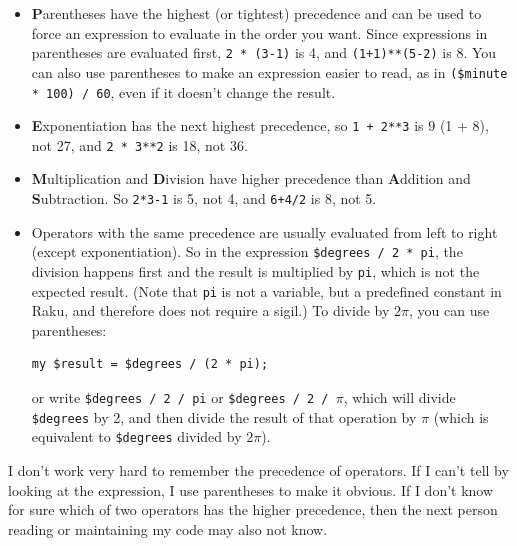\begin{itemize}

\item {\bf P}arentheses have the highest (or tightest) precedence and can be used 
to force an expression to evaluate in the order you want. Since
expressions in parentheses are evaluated first, {\tt 2 * (3-1)} is 4,
and {\tt (1+1)**(5-2)} is 8. You can also use parentheses to make an
expression easier to read, as in {\tt (\$minute * 100) / 60}, even
if it doesn't change the result.

\item {\bf E}xponentiation has the next highest precedence, so
{\tt 1 + 2**3} is 9 (1 + 8), not 27, and {\tt 2 * 3**2} is 18, not 36.

\item {\bf M}ultiplication and {\bf D}ivision have higher precedence
  than {\bf A}ddition and {\bf S}ubtraction.  So {\tt 2*3-1} is 5, not
  4, and {\tt 6+4/2} is 8, not 5.

\item Operators with the same precedence are usually evaluated 
from left to right (except exponentiation).  So in the expression 
{\tt \$degrees / 2 * pi}, the division happens first and the 
result is multiplied by {\tt pi}, which is not the expected 
result. (Note that {\tt pi} is not a variable, but a predefined 
constant in Raku, and therefore does not require a sigil.)  To 
divide by $2 \pi$, you can use parentheses:
  
\begin{verbatim}
my $result = $degrees / (2 * pi);  
\end{verbatim}  
 
or write
  {\tt \$degrees / 2 / pi} or {\tt \$degrees / 2 / $\pi$}, which
  will divide \verb'$degrees' by 2, and then divide the result of 
  that operation by $\pi$ (which is equivalent to \verb'$degrees'
  divided by $2 \pi$).

\end{itemize}

I don't work very hard to remember the precedence of
operators.  If I can't tell by looking at the expression, I use
parentheses to make it obvious. If I don't know for sure which of two operators 
has the higher precedence, then the next person reading or maintaining 
my code may also not know.


